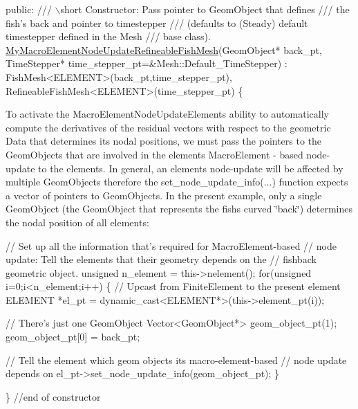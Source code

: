 \begin{DoxyCodeInclude}

\textcolor{keyword}{public}: 
\textcolor{comment}{}
\textcolor{comment}{ /// \(\backslash\)short Constructor: Pass pointer to GeomObject that defines}
\textcolor{comment}{ /// the fish's back and pointer to timestepper}
\textcolor{comment}{ /// (defaults to (Steady) default timestepper defined in the Mesh}
\textcolor{comment}{ /// base class).}
\textcolor{comment}{} \hyperlink{classMyMacroElementNodeUpdateRefineableFishMesh}{MyMacroElementNodeUpdateRefineableFishMesh}(GeomObject* back\_pt, 
                   TimeStepper* time\_stepper\_pt=&Mesh::Default\_TimeStepper) :  
  FishMesh<ELEMENT>(back\_pt,time\_stepper\_pt),
  RefineableFishMesh<ELEMENT>(time\_stepper\_pt)
  \{

\end{DoxyCodeInclude}


To activate the {\ttfamily Macro\+Element\+Node\+Update\+Element\textquotesingle{}s} ability to automatically compute the derivatives of the residual vectors with respect to the geometric {\ttfamily Data} that determines its nodal positions, we must pass the pointers to the {\ttfamily Geom\+Objects} that are involved in the element\textquotesingle{}s {\ttfamily Macro\+Element} -\/ based node-\/update to the elements. In general, an element\textquotesingle{}s node-\/update will be affected by multiple {\ttfamily Geom\+Objects} therefore the {\ttfamily set\+\_\+node\+\_\+update\+\_\+info}(...) function expects a vector of pointers to {\ttfamily Geom\+Objects}. In the present example, only a single {\ttfamily Geom\+Object} (the {\ttfamily Geom\+Object} that represents the fish\textquotesingle{}s curved \char`\"{}back\char`\"{}) determines the nodal position of all elements\+:


\begin{DoxyCodeInclude}
   \textcolor{comment}{// Set up all the information that's required for MacroElement-based}
   \textcolor{comment}{// node update: Tell the elements that their geometry depends on the}
   \textcolor{comment}{// fishback geometric object. }
   \textcolor{keywordtype}{unsigned} n\_element = this->nelement();
   \textcolor{keywordflow}{for}(\textcolor{keywordtype}{unsigned} i=0;i<n\_element;i++)
    \{
     \textcolor{comment}{// Upcast from FiniteElement to the present element}
     ELEMENT *el\_pt = \textcolor{keyword}{dynamic\_cast<}ELEMENT*\textcolor{keyword}{>}(this->element\_pt(i));

     \textcolor{comment}{// There's just one GeomObject}
     Vector<GeomObject*> geom\_object\_pt(1);
     geom\_object\_pt[0] = back\_pt;
     
     \textcolor{comment}{// Tell the element which geom objects its macro-element-based}
     \textcolor{comment}{// node update depends on     }
     el\_pt->set\_node\_update\_info(geom\_object\_pt);
    \}

  \} \textcolor{comment}{//end of constructor}

\end{DoxyCodeInclude}


